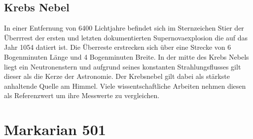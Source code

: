 \subsection{Krebs Nebel}
In einer Entfernung von 6400 Lichtjahre befindet sich im Sternzeichen Stier der Überrrest der ersten und letzten dokumentierten Supernovaexplosion die auf das Jahr 1054 datiert ist. 
Die Überreste erstrecken sich über eine Strecke von 6 Bogenminuten Länge und 4 Bogenminuten Breite. 
In der mitte des Krebs Nebels liegt ein Neutronenstern und aufgrund seines konstanten Strahlungsflusses gilt dieser als die Kerze der Astronomie. 
Der Krebsnebel gilt dabei als stärkste anhaltende Quelle am Himmel. 
Viele wissentschaftliche Arbeiten nehmen diesen als Referenzwert um ihre Messwerte zu vergleichen. 

\section{Markarian 501}
